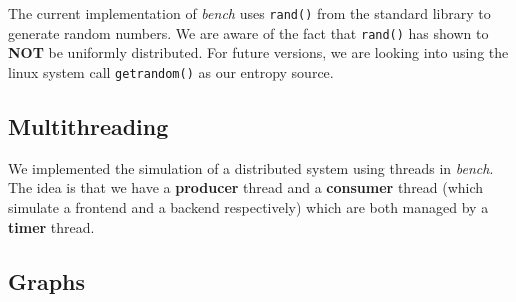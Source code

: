 \documentclass[10pt, author, twocolumn]{article}
\begin{document}
The current implementation of \textit{bench} uses \texttt{rand()} from the standard library to generate random numbers. We are aware of the fact that \texttt{rand()} has shown to \textbf{NOT} be uniformly distributed. For future versions, we are looking into using the linux system call \texttt{getrandom()} as our entropy source. 

\subsection{Multithreading}
We implemented the simulation of a distributed system using threads in \textit{bench}. The idea is that we have a \textbf{producer} thread and a \textbf{consumer} thread (which simulate a frontend and a backend respectively) which are both managed by a \textbf{timer} thread.



\subsection{Graphs}
	 
\end{document}
